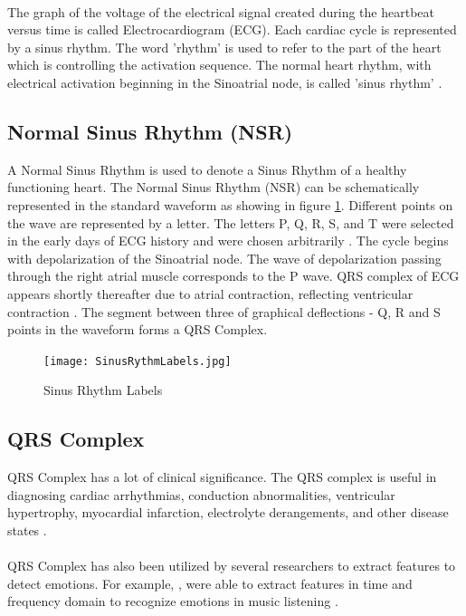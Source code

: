 \paragraph{}
The graph of the voltage of the electrical signal created during the heartbeat versus time is called Electrocardiogram (ECG). Each cardiac cycle is represented by a sinus rhythm. The word 'rhythm' is used to refer to the part of the heart which is controlling the activation sequence. The normal heart rhythm, with electrical activation beginning in the Sinoatrial node, is called 'sinus rhythm' \cite{hampton_ecg_2013}.

\subsection{Normal Sinus Rhythm (NSR)}
A Normal Sinus Rhythm is used to denote a Sinus Rhythm of a healthy functioning heart. The Normal Sinus Rhythm (NSR) can be schematically represented in the standard waveform as showing in figure \ref{fig:sinus_rhythm_labels}. Different points on the wave are represented by a letter. The letters P, Q, R, S, and T were selected in the early days of ECG history and were chosen arbitrarily \cite{hampton_ecg_2013}. The cycle begins with depolarization of the Sinoatrial node. The wave of depolarization passing through the right atrial muscle corresponds to the P wave. QRS complex of ECG appears shortly thereafter due to atrial contraction, reflecting ventricular contraction \cite{cacioppo_cardiovascular_2016_p_183_216}. The segment between three of graphical deflections - Q, R and S points in the waveform forms a QRS Complex.

\begin{figure}
    \centering
    \texttt{[image: SinusRythmLabels.jpg]}
    \caption{Sinus Rhythm Labels \cite{cacioppo_cardiovascular_2016_p_183_216}}
    \label{fig:sinus_rhythm_labels}
\end{figure}

\subsection{QRS Complex}
QRS Complex has a lot of clinical significance. The QRS complex is useful in diagnosing cardiac arrhythmias, conduction abnormalities, ventricular hypertrophy, myocardial infarction, electrolyte derangements, and other disease states \cite{noauthor_qrs_2018}.
\paragraph{}
QRS Complex has also been utilized by several researchers to extract features to detect emotions. For example, \citeauthor{kim_emotion_2004}, were able to extract features in time and frequency domain to recognize emotions in music listening \cite{kim_emotion_2004}.

